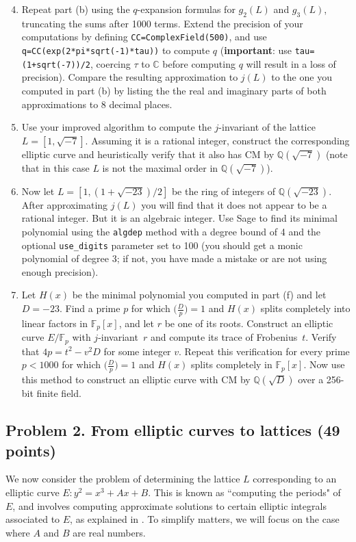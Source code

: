 \documentclass[11pt]{article}
\newcommand{\Fp}{\mathbb{F}_p}
\newcommand{\Q}{\mathbb{Q}}
\newcommand{\C}{\mathbb{C}}
\begin{document}
\begin{enumerate}[{\bf (a)}]
\setcounter{enumi}{3}
\item
Repeat part (b) using the $q$-expansion formulas for $g_2(L)$ and $g_3(L)$, truncating the sums after 1000 terms.
Extend the precision of your computations by defining \texttt{CC=ComplexField(500)}, and use
\texttt{q=CC(exp(2*pi*sqrt(-1)*tau))} to compute $q$  (\textbf{important}: use \texttt{tau=(1+sqrt(-7))/2}, coercing $\tau$ to $\C$ before computing $q$ will result in a loss of precision).
Compare the resulting approximation to $j(L)$ to the one you computed in part (b) by listing the the real and imaginary parts of both approximations to $8$ decimal places.

\item
Use your improved algorithm to compute the $j$-invariant of the lattice $L=[1,\sqrt{-7}]$.
Assuming it is a rational integer, construct the corresponding elliptic curve and heuristically verify that it also has CM by  $\Q(\sqrt{-7})$ (note that in this case $L$ is not the maximal order in $\Q(\sqrt{-7})$).

\item
Now let $L=[1,(1+\sqrt{-23})/2]$ be the ring of integers of $\Q(\sqrt{-23})$.
After approximating $j(L)$ you will find that it does not appear to be a rational integer.
But it is an algebraic integer.  Use Sage to find its minimal polynomial using the \texttt{algdep} method with a degree bound of 4 and the optional \texttt{use\_digits} parameter set to 100  (you should get a monic polynomial of degree 3; if not, you have made a mistake or are not using enough precision).

\item
Let $H(x)$ be the minimal polynomial you computed in part (f) and let $D=-23$.
Find a prime $p$ for which $\bigl(\frac{D}{p}\bigr)=1$ and $H(x)$ splits completely into linear factors in $\Fp[x]$, and let $r$ be one of its roots.
Construct an elliptic curve $E/\Fp$ with $j$-invariant~$r$ and compute its trace of Frobenius~$t$.
Verify that $4p=t^2-v^2D$ for some integer $v$.
Repeat this verification for every prime $p<1000$ for which $\bigl(\frac{D}{p}\bigr)=1$ and $H(x)$ splits completely in $\Fp[x]$.
Now use this method to construct an elliptic curve with CM by $\Q(\sqrt{D})$ over a 256-bit finite field.

\end{enumerate}

\subsection*{Problem  2. From elliptic curves to lattices (49 points)}
We now consider the problem of determining the lattice $L$ corresponding to an elliptic curve $E\colon y^2=x^3+Ax+B$. This is known as ``computing the periods" of $E$, and involves computing approximate solutions to certain elliptic integrals associated to $E$, as explained in \cite[\S 9.4]{washington}.
To simplify matters, we will focus on the case where $A$ and $B$ are real numbers.
\end{document}
